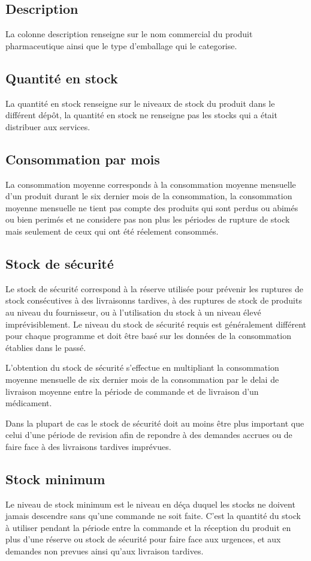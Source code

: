 \documentclass[12pt,a4paper]{report}
\begin{document}
\subsection{Description}
La colonne description renseigne sur le nom commercial du produit pharmaceutique ainsi que le type d'emballage qui le categorise.

\subsection{Quantité en stock}
La quantité en stock renseigne sur le niveaux de stock du produit dans le différent dépôt, la quantité en stock ne renseigne pas les stocks qui a était distribuer aux services.

\subsection{Consommation par mois}
La consommation moyenne corresponds à la consommation moyenne mensuelle d'un produit durant le six dernier mois de la consommation, la consommation moyenne mensuelle ne tient pas compte des produits qui sont perdus ou abimés ou bien perimés et ne considere pas non plus les périodes de rupture de stock mais seulement de ceux qui ont été réelement consommés.

\subsection{Stock de sécurité}
Le stock de sécurité correspond à la réserve utilisée pour prévenir les ruptures de stock consécutives à des livraisonns tardives, à des ruptures de stock de produits au niveau du fournisseur, ou à l'utilisation du stock à un niveau élevé imprévisiblement. Le niveau du stock de sécurité requis est généralement différent pour chaque programme et doit être basé sur les données de la consommation établies dans le passé.

L'obtention du stock de sécurité s'effectue en multipliant la consommation moyenne mensuelle de six dernier mois de la consommation par le delai de livraison moyenne entre la période de commande et de livraison d'un médicament.

Dans la plupart de cas le stock de sécurité doit au moins être plus important que celui d'une période de revision afin de repondre à des demandes accrues ou de faire face à des livraisons tardives imprévues. 

\subsection{Stock minimum}
Le niveau de stock minimum est le niveau en déça duquel les stocks ne doivent jamais descendre sans qu'une commande ne soit faite. C'est la quantité du stock à utiliser pendant la période entre la commande et la réception du produit en plus d'une réserve ou stock de sécurité pour faire face aux urgences, et aux demandes non prevues ainsi qu'aux livraison tardives.
\end{document}
